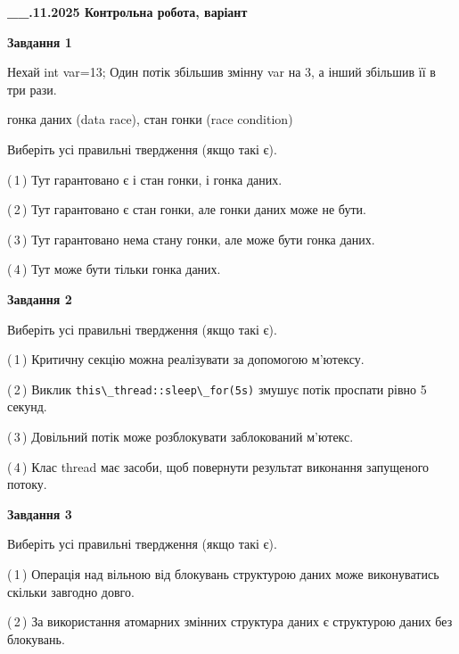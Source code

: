 \documentclass[12pt, ukrainian]{article}
\def\code#1{\Verb!#1!}
\begin{document}
\begin {large}

\textbf{\_\_.11.2025 Контрольна робота, варіант  }\par


{

\begin{center}
\textbf{Завдання 1}
\end{center}
Нехай int var=13; Один потік збільшив змінну var на 3, а інший збільшив її в три рази.

гонка даних (data race), стан гонки (race condition)

Виберіть усі правильні твердження (якщо такі є).\par
\vspace{2mm}
(\,1\,) Тут гарантовано є і стан гонки, і гонка даних.%

(\,2\,) Тут гарантовано є стан гонки, але гонки даних може не бути.%

(\,3\,) Тут гарантовано нема стану гонки, але може бути гонка даних.%

(\,4\,) Тут може бути тільки гонка даних.%



\begin{center}
\textbf{Завдання 2}
\end{center}
Виберіть усі правильні твердження (якщо такі є).\par
\vspace{2mm}

(\,1\,) Критичну секцію можна реалізувати за допомогою м’ютексу.%

(\,2\,) Виклик \code{this\_thread::sleep\_for(5s)} змушує потік проспати рівно 5 секунд.%

(\,3\,) Довільний потік може розблокувати заблокований м’ютекс.%

(\,4\,) Клас thread має засоби, щоб повернути результат виконання запущеного потоку.%



\begin{center}
\textbf{Завдання 3}
\end{center}
Виберіть усі правильні твердження (якщо такі є).\par
\vspace{2mm}

(\,1\,) Операція над вільною від блокувань структурою даних може виконуватись скільки завгодно довго.%

(\,2\,) За використання атомарних змінних структура даних є структурою даних без блокувань.%

}
\end{large}
\end{document}
